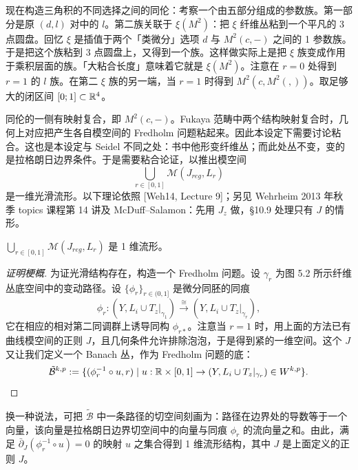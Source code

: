 现在构造三角积的不同选择之间的同伦：考察一个由五部分组成的参数族。第一部分是原 $(d,l)$ 对中的 $l$。第二族关联于 $\xi(M^2)$：把 $\xi$ 纤维丛粘到一个平凡的 3 点圆盘。回忆 $\xi$ 是插值于两个「类微分」选项 $d$ 与 $M^2(c,-)$ 之间的 1 参数族。于是把这个族粘到 3 点圆盘上，又得到一个族。这样做实际上是把 $\xi$ 族变成作用于乘积层面的族。「大粘合长度」意味着它就是 $\xi(M^2)$。注意在 $r=0$ 处得到 $r=1$ 的 $l$ 族。在第二 $\xi$ 族的另一端，当 $r=1$ 时得到 $M^2(c,M^2(,))$。取足够大的闭区间 $[0;1]\subset\mathbb{R}^4$。


\begin{remark}\label{rem:gluing}
同伦的一侧有映射复合，即 $M^2(c,-)$。Fukaya 范畴中两个结构映射复合时，几何上对应把产生各自模空间的 Fredholm 问题粘起来。因此本设定下需要讨论粘合。这也是本设定与 Seidel 不同之处：书中他形变纤维丛；而此处丛不变，变的是拉格朗日边界条件。于是需要粘合论证，以推出模空间
\[
\bigcup_{r\in[0,1]}\mathcal{M}(J_{reg},L_r)
\]
是一维光滑流形。以下理论依照 [Weh14, Lecture 9]；另见 Wehrheim 2013 年秋季 topics 课程第 14 讲及 McDuff--Salamon：先用 $J_z$ 做，§10.9 处理只有 $J$ 的情形。
\end{remark}

\begin{claim}\label{claim:1dim}
$\displaystyle\bigcup_{r\in[0,1]}\mathcal{M}(J_{reg},L_r)$ 是 1 维流形。
\end{claim}

\begin{proof}[证明梗概]
为证光滑结构存在，构造一个 Fredholm 问题。设 $\gamma_r$ 为图 5.2 所示纤维丛底空间中的变动路径。设 $\{\phi_r\}_{r\in(0,1]}$ 是微分同胚的同痕
\[
\phi_r:(Y,L_i\cup T_z|_{\gamma_1})\xrightarrow{\cong}(Y,L_i\cup T_z|_{\gamma_r}),
\]
它在相应的相对第二同调群上诱导同构 $\phi_{r*}$。注意当 $r=1$ 时，用上面的方法已有曲线模空间的正则 $J$，且几何条件允许排除泡泡，于是得到紧的一维空间。这个 $J$ 又让我们定义一个 Banach 丛，作为 Fredholm 问题的底：
\[
\tilde{\mathcal{B}}^{k,p}:=\{(\phi_r^{-1}\circ u,r)\mid u:\mathbb{R}\times[0,1]\to(Y,L_i\cup T_z|_{\gamma_r})\in W^{k,p}\}.
\]
\end{proof}

换一种说法，可把 $\tilde{\mathcal{B}}$ 中一条路径的切空间刻画为：路径在边界处的导数等于一个向量，该向量是拉格朗日边界切空间中的向量与同痕 $\phi_r$ 的流向量之和。由此，满足 $\bar\partial_J(\phi_r^{-1}\circ u)=0$ 的映射 $u$ 之集合得到 1 维流形结构，其中 $J$ 是上面定义的正则 $J$。

